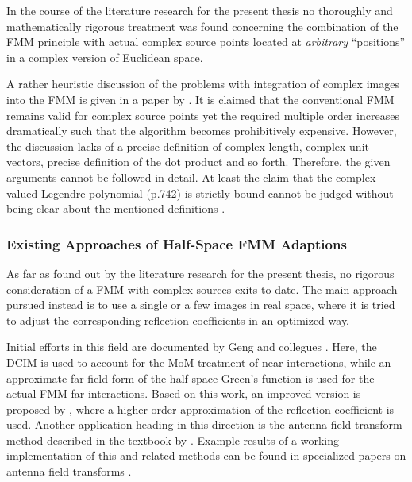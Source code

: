 In the course of the literature research for the present thesis no thoroughly
and  mathematically rigorous treatment was found concerning the combination
of the \ac{FMM} principle with actual complex source points located at
\emph{arbitrary} \enquote{positions} in a complex version of Euclidean space.

A rather heuristic discussion of the problems with integration of complex
images into the \ac{FMM} is given in a paper by \textcite{Geng2001}.
It is claimed that the conventional \ac{FMM} remains valid for complex source 
points yet the required multiple order increases dramatically such that the
algorithm becomes prohibitively expensive.
However, the discussion lacks of a precise definition of complex length,
complex unit vectors, precise definition of the dot product and so forth.
Therefore, the given arguments cannot be followed in detail.
At least the claim that the complex-valued Legendre polynomial (p.742) is
strictly bound cannot be judged without being clear about the mentioned
definitions \cite[pp.~375]{Olver2010}.







\subsubsection{Existing Approaches of Half-Space FMM Adaptions}

As far as found out by the literature research for the present thesis, no
rigorous consideration of a \ac{FMM} with complex sources exits to date.
The main approach pursued instead is to use a single or a few
images in real space, where it is tried to adjust the corresponding
reflection coefficients in an optimized way.

Initial efforts in this field are documented by Geng and collegues
\cite{Geng1999,Geng2000,Geng2001}.
Here, the \ac{DCIM} is used to account for the \ac{MoM} treatment of near
interactions, while an approximate far field form of the half-space Green's
function is used for the actual \ac{FMM} far-interactions.
Based on this work, an improved version is proposed by \textcite{Liu2002},
where a higher order approximation of the reflection coefficient is used.
Another application heading in this direction is the antenna field transform
method described in the textbook by \textcite[Section~8.13.2]{parini2020}.
Example results of a working implementation of this and related methods can be
found in specialized papers on antenna field transforms
\cite{Eibert2018,Eibert2018a,Eibert2019}.






